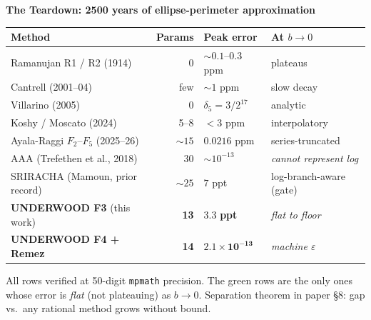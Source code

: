 \documentclass[11pt,landscape]{article}
\begin{document}
\noindent
\begin{minipage}[t]{0.68\textwidth}
\small
\centering
\textbf{The Teardown: 2500 years of ellipse-perimeter approximation}\\[2pt]
\begin{tabular}{@{}l@{\ }rll@{}}
\toprule
\textbf{Method} & \textbf{Params} & \textbf{Peak error} & \textbf{At $b\!\to\!0$} \\
\midrule
Ramanujan R1 / R2 (1914)            & 0            & $\sim 0.1$--$0.3$ ppm   & plateaus \\
Cantrell (2001--04)                 & few          & $\sim 1$ ppm            & slow decay \\
Villarino (2005)                    & 0            & $\delta_5 = 3/2^{17}$   & analytic \\
Koshy / Moscato (2024)              & 5--8         & $< 3$ ppm               & interpolatory \\
Ayala-Raggi $F_2$--$F_5$ (2025--26) & ${\sim}15$   & $0.0216$ ppm            & series-truncated \\
AAA (Trefethen et al., 2018)        & 30           & ${\sim}10^{-13}$        & \emph{cannot represent log} \\
\midrule
\rowcolor{yellowfill}
SRIRACHA (Mamoun, prior record)      & ${\sim}25$   & $7$ ppt                 & log-branch-aware (gate) \\
\rowcolor{greenfill}
\textbf{UNDERWOOD F3} (this work)    & \textbf{13}  & $\mathbf{3.3}$ \textbf{ppt}  & \emph{flat to floor} \\
\rowcolor{greenfill}
\textbf{UNDERWOOD F4 + Remez}        & \textbf{14}  & $\mathbf{2.1{\times}10^{-13}}$ & \emph{machine $\varepsilon$} \\
\bottomrule
\end{tabular}

\vspace{4pt}

{\footnotesize All rows verified at 50-digit \texttt{mpmath} precision.
The green rows are the only ones whose error is \emph{flat} (not
plateauing) as $b \to 0$.  Separation theorem in paper \S8:
gap vs.\ any rational method grows without bound.}
\end{minipage}%
\hfill
\end{document}
